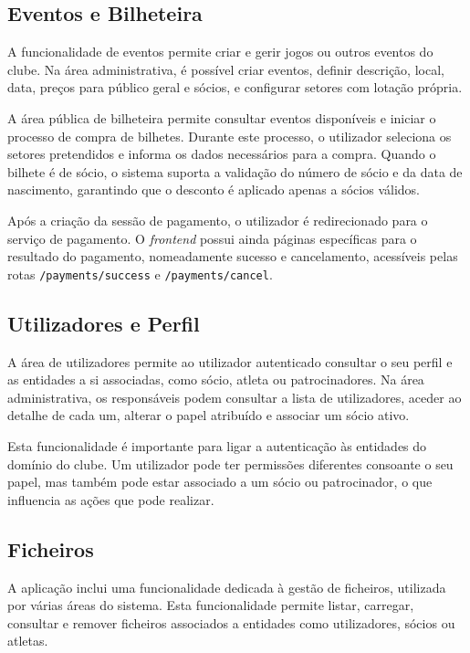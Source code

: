 \subsection{Eventos e Bilheteira}

A funcionalidade de eventos permite criar e gerir jogos ou outros eventos do
clube. Na área administrativa, é possível criar eventos, definir descrição,
local, data, preços para público geral e sócios, e configurar setores com
lotação própria.

A área pública de bilheteira permite consultar eventos disponíveis e iniciar o
processo de compra de bilhetes. Durante este processo, o utilizador seleciona
os setores pretendidos e informa os dados necessários para a compra. Quando o
bilhete é de sócio, o sistema suporta a validação do número de sócio e da data
de nascimento, garantindo que o desconto é aplicado apenas a sócios válidos.

Após a criação da sessão de pagamento, o utilizador é redirecionado para o
serviço de pagamento. O \textit{frontend} possui ainda páginas específicas para
o resultado do pagamento, nomeadamente sucesso e cancelamento, acessíveis pelas
rotas \texttt{/payments/success} e \texttt{/payments/cancel}.

\subsection{Utilizadores e Perfil}

A área de utilizadores permite ao utilizador autenticado consultar o seu perfil
e as entidades a si associadas, como sócio, atleta ou patrocinadores. Na área
administrativa, os responsáveis podem consultar a lista de utilizadores, aceder
ao detalhe de cada um, alterar o papel atribuído e associar um sócio ativo.

Esta funcionalidade é importante para ligar a autenticação às entidades do
domínio do clube. Um utilizador pode ter permissões diferentes consoante o seu
papel, mas também pode estar associado a um sócio ou patrocinador, o que
influencia as ações que pode realizar.

\subsection{Ficheiros}

A aplicação inclui uma funcionalidade dedicada à gestão de ficheiros, utilizada
por várias áreas do sistema. Esta funcionalidade permite listar, carregar,
consultar e remover ficheiros associados a entidades como utilizadores, sócios
ou atletas.

